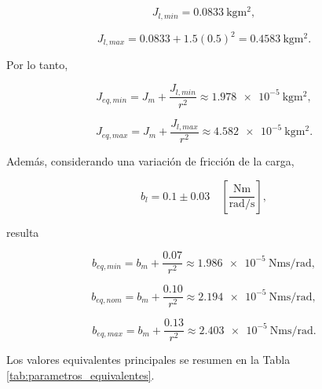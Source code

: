 \documentclass[10pt,a4paper]{article}
\begin{document}
\begin{equation}
    J_{l,min}
    =
    0.0833\ \si{\kilogram\meter\squared},
\end{equation}

\begin{equation}
    J_{l,max}
    =
    0.0833+1.5(0.5)^2
    =
    0.4583\ \si{\kilogram\meter\squared}.
\end{equation}

Por lo tanto,

\begin{equation}
    J_{eq,min}
    =
    J_m+
    \frac{J_{l,min}}{r^2}
    \approx
    \SI{1.978e-5}{\kilogram\meter\squared},
\end{equation}

\begin{equation}
    J_{eq,max}
    =
    J_m+
    \frac{J_{l,max}}{r^2}
    \approx
    \SI{4.582e-5}{\kilogram\meter\squared}.
\end{equation}

Además, considerando una variación de fricción de la carga,

\begin{equation}
    b_l
    =
    0.1 \pm 0.03
    \quad
    \left[
    \frac{\si{\newton\meter}}{\si{\radian\per\second}}
    \right],
\end{equation}

resulta

\begin{equation}
    b_{eq,min}
    =
    b_m+
    \frac{0.07}{r^2}
    \approx
    \SI{1.986e-5}{\newton\meter\second\per\radian},
\end{equation}

\begin{equation}
    b_{eq,nom}
    =
    b_m+
    \frac{0.10}{r^2}
    \approx
    \SI{2.194e-5}{\newton\meter\second\per\radian},
\end{equation}

\begin{equation}
    b_{eq,max}
    =
    b_m+
    \frac{0.13}{r^2}
    \approx
    \SI{2.403e-5}{\newton\meter\second\per\radian}.
\end{equation}

Los valores equivalentes principales se resumen en la Tabla \ref{tab:parametros_equivalentes}.
\end{document}
